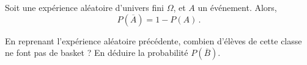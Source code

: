 \documentclass{article}
\begin{document}
\begin{tcolorbox}
\begin{proposition}
Soit une expérience aléatoire d'univers fini $\Omega$, et $A$ un événement. Alors,
\begin{equation*}
P(\overbar{A})=1 - P(A)\,.    
\end{equation*}    
\end{proposition}
\end{tcolorbox}
\begin{example}
En reprenant l'expérience aléatoire précédente, combien d'élèves de cette classe ne font pas de basket ? En déduire la probabilité $P(\overbar{B})$.

\emptybox{2cm}
\end{example}
\end{document}
